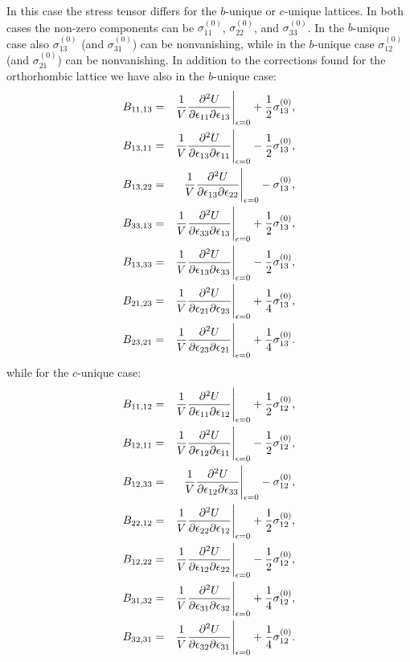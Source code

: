 \documentclass[12pt,a4paper,twoside]{report}
\begin{document}
In this case the stress tensor differs for the $b$-unique or $c$-unique
lattices. In both cases the non-zero components can be $\sigma^{(0)}_{11}$, 
$\sigma^{(0)}_{22}$, and $\sigma^{(0)}_{33}$. In the $b$-unique case 
also $\sigma^{(0)}_{13}$ (and $\sigma^{(0)}_{31}$) can be nonvanishing, 
while in the $b$-unique case $\sigma^{(0)}_{12}$ 
(and $\sigma^{(0)}_{21}$) can be nonvanishing.
In addition to the corrections found for the orthorhombic lattice 
we have also in the $b$-unique case:
\begin{eqnarray}
B_{11,13} &=& {1 \over V}{\partial^2 U \over \partial \epsilon_{11}
\partial \epsilon_{13}}\Bigg|_{\epsilon=0} +{1\over 2}\sigma^{(0)}_{13}, \\
B_{13,11} &=& {1 \over V}{\partial^2 U \over \partial \epsilon_{13}
\partial \epsilon_{11}}\Bigg|_{\epsilon=0} -{1\over 2}\sigma^{(0)}_{13}, \\
B_{13,22} &=& {1 \over V}{\partial^2 U \over \partial \epsilon_{13}
\partial \epsilon_{22}}\Bigg|_{\epsilon=0} -\sigma^{(0)}_{13}, \\
B_{33,13} &=& {1 \over V}{\partial^2 U \over \partial \epsilon_{33}
\partial \epsilon_{13}}\Bigg|_{\epsilon=0} +{1\over 2}\sigma^{(0)}_{13}, \\
B_{13,33} &=& {1 \over V}{\partial^2 U \over \partial \epsilon_{13}
\partial \epsilon_{33}}\Bigg|_{\epsilon=0} -{1\over 2}\sigma^{(0)}_{13}, \\
B_{21,23} &=& {1 \over V}{\partial^2 U \over \partial \epsilon_{21}
\partial \epsilon_{23}}\Bigg|_{\epsilon=0} + {1\over 4}\sigma^{(0)}_{13}, \\
B_{23,21} &=& {1 \over V}{\partial^2 U \over \partial \epsilon_{23}
\partial \epsilon_{21}}\Bigg|_{\epsilon=0} +{1\over 4}\sigma^{(0)}_{13}. 
\end{eqnarray}
while for the $c$-unique case:
\begin{eqnarray}
B_{11,12} &=& {1 \over V}{\partial^2 U \over \partial \epsilon_{11}
\partial \epsilon_{12}}\Bigg|_{\epsilon=0} +{1\over 2}\sigma^{(0)}_{12}, \\
B_{12,11} &=& {1 \over V}{\partial^2 U \over \partial \epsilon_{12}
\partial \epsilon_{11}}\Bigg|_{\epsilon=0} -{1\over 2}\sigma^{(0)}_{12}, \\
B_{12,33} &=& {1 \over V}{\partial^2 U \over \partial \epsilon_{12}
\partial \epsilon_{33}}\Bigg|_{\epsilon=0} -\sigma^{(0)}_{12}, \\
B_{22,12} &=& {1 \over V}{\partial^2 U \over \partial \epsilon_{22}
\partial \epsilon_{12}}\Bigg|_{\epsilon=0} +{1\over 2}\sigma^{(0)}_{12}, \\
B_{12,22} &=& {1 \over V}{\partial^2 U \over \partial \epsilon_{12}
\partial \epsilon_{22}}\Bigg|_{\epsilon=0} -{1\over 2}\sigma^{(0)}_{12}, \\
B_{31,32} &=& {1 \over V}{\partial^2 U \over \partial \epsilon_{31}
\partial \epsilon_{32}}\Bigg|_{\epsilon=0} + {1\over 4}\sigma^{(0)}_{12}, \\
B_{32,31} &=& {1 \over V}{\partial^2 U \over \partial \epsilon_{32}
\partial \epsilon_{31}}\Bigg|_{\epsilon=0} +{1\over 4}\sigma^{(0)}_{12}. 
\end{eqnarray}
\end{document}
